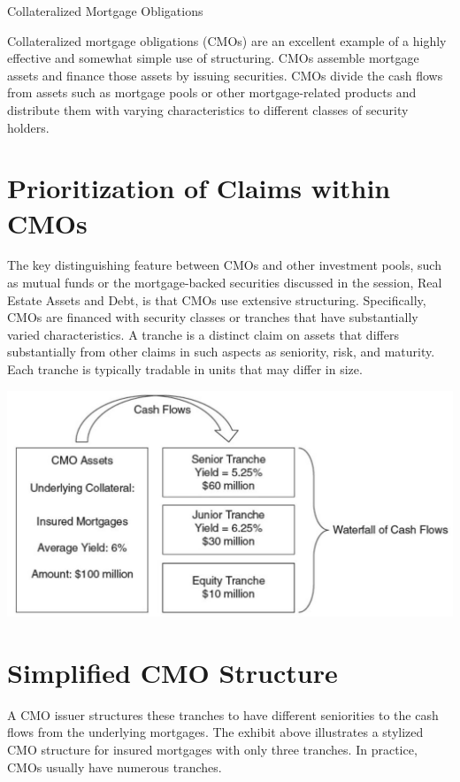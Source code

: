 \documentclass[11pt]{article}
\begin{document}
Collateralized Mortgage Obligations

Collateralized mortgage obligations (CMOs) are an excellent example of a highly effective and somewhat simple use of structuring. CMOs assemble mortgage assets and finance those assets by issuing securities. CMOs divide the cash flows from assets such as mortgage pools or other mortgage-related products and distribute them with varying characteristics to different classes of security holders.

\section*{Prioritization of Claims within CMOs}
The key distinguishing feature between CMOs and other investment pools, such as mutual funds or the mortgage-backed securities discussed in the session, Real Estate Assets and Debt, is that CMOs use extensive structuring. Specifically, CMOs are financed with security classes or tranches that have substantially varied characteristics. A tranche is a distinct claim on assets that differs substantially from other claims in such aspects as seniority, risk, and maturity. Each tranche is typically tradable in units that may differ in size.

\begin{center}
\includegraphics[max width=\textwidth]{2024_04_09_08813c5d5454963abf79g-2}
\end{center}

\section*{Simplified CMO Structure}
A CMO issuer structures these tranches to have different seniorities to the cash flows from the underlying mortgages. The exhibit above illustrates a stylized CMO structure for insured mortgages with only three tranches. In practice, CMOs usually have numerous tranches.
\end{document}
